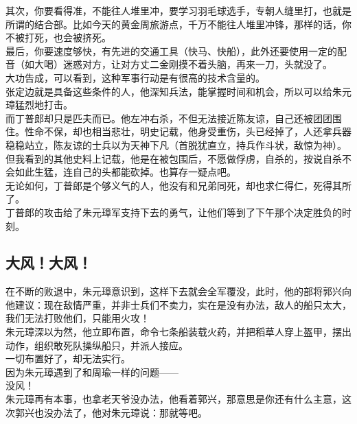 \begin{multicols}{\theparacolNo}
其次，你要看得准，不能往人堆里冲，要学习羽毛球选手，专朝人缝里打，也就是所谓的结合部。比如今天的黄金周旅游点，千万不能往人堆里冲锋，那样的话，你不被打死，也会被挤死。\\

最后，你要速度够快，有先进的交通工具（快马、快船），此外还要使用一定的配音（如大喝）迷惑对方，让对方丈二金刚摸不着头脑，再来一刀，头就没了。\\

大功告成，可以看到，这种军事行动是有很高的技术含量的。\\

张定边就是具备这些条件的人，他深知兵法，能掌握时间和机会，所以可以给朱元璋猛烈地打击。\\

而丁普郎却只是匹夫而已。他左冲右杀，不但无法接近陈友谅，自己还被团团围住。性命不保，却也相当悲壮，明史记载，他身受重伤，头已经掉了，人还拿兵器稳稳站立，陈友谅的士兵以为天神下凡（首脱犹直立，持兵作斗状，敌惊为神）。但我看到的其他史料上记载，他是在被包围后，不愿做俘虏，自杀的，按说自杀不会如此生猛，连自己的头都能砍掉。也算存一疑点吧。\\

无论如何，丁普郎是个够义气的人，他没有和兄弟同死，却也求仁得仁，死得其所了。\\

丁普郎的攻击给了朱元璋军支持下去的勇气，让他们等到了下午那个决定胜负的时刻。\\

\subsection{大风！大风！}
在不断的败退中，朱元璋意识到，这样下去就会全军覆没，此时，他的部将郭兴向他建议：现在敌情严重，并非士兵们不卖力，实在是没有办法，敌人的船只太大，我们无法打败他们，只能用火攻！\\

朱元璋深以为然，他立即布置，命令七条船装载火药，并把稻草人穿上盔甲，摆出动作，组织敢死队操纵船只，并派人接应。\\

一切布置好了，却无法实行。\\

因为朱元璋遇到了和周瑜一样的问题——\\

没风！\\

朱元璋再有本事，也拿老天爷没办法，他看着郭兴，那意思是你还有什么主意，这次郭兴也没办法了，他对朱元璋说：那就等吧。\\


\end{multicols}
